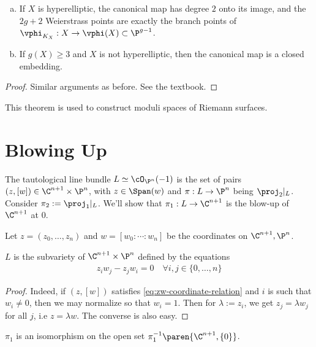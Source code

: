 \documentclass[11pt]{report}
\begin{document}
\begin{thm}
\begin{enumerate}[(a)]
    \item If $X$ is hyperelliptic, the canonical map has degree $2$ onto its image, and the $2g+2$ Weierstrass points are exactly the branch points of $\vphi_{K_X}:X \to \vphi(X) \subset \P^{g-1}$.
    \item If $g(X) \ge 3$ and $X$ is not hyperelliptic, then the canonical map is a closed embedding.
\end{enumerate}
\end{thm}

\begin{proof}
Similar arguments as before. See the textbook.
\end{proof}

This theorem is used to construct moduli spaces of Riemann surfaces.

\section{Blowing Up}

The tautological line bundle $L \simeq \cO_{\P^n}(-1)$ is the set of pairs $(z,[w]) \in \C^{n +1}\times \P^n$, with $z \in \Span(w)$ and $\pi : L \to \P^n$ being $\proj_2|_L$. Consider $\pi_2 := \proj_1|_L$. We'll show that $\pi_1: L \to \C^{n+1}$ is the blow-up of $\C^{n+1}$ at $0$.

Let $z = (z_0,\dots,z_n)$ and $w=[w_0:\cdots :w_n]$ be the coordinates on $\C^{n+1},\P^n$.

\begin{claim}
$L$ is the subvariety of $\C^{n+1}\times \P^n$ defined by the equations
\begin{align*} \label{eq:zw-coordinate-relation}
z_iw_j-z_jw_i=0 \quad \forall i,j \in \{0,\dots,n\}
\end{align*}
\end{claim}

\begin{proof}
Indeed, if $(z,[w])$ satisfies \eqref{eq:zw-coordinate-relation} and $i$ is such that $w_i \ne 0$, then we may normalize so that $w_i=1$. Then for $\lambda :=z_i$, we get $z_j = \lambda w_j$ for all $j$, i.e $z = \lambda w$. The converse is also easy.
\end{proof}

\begin{claim}
$\pi_1$ is an isomorphism on the open set $\pi_1^{-1}\paren{\C^{n+1},\{0\}}$.
\end{claim}
\end{document}
